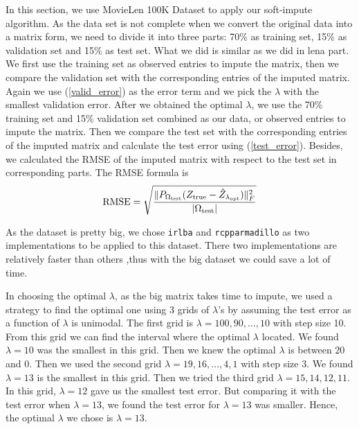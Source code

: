 \documentclass{article}
\begin{document}
	In this section, we use MovieLen 100K Dataset to apply our soft-impute algorithm. As the data set is not complete when we convert the original data into a matrix form, we need to divide it into three parts: 70\% as training set, 15\% as validation set and 15\% as test set. What we did is similar as we did in lena part. We first use the training set as observed entries to impute the matrix, then we compare the validation set with the corresponding entries of the imputed matrix. Again we use (\ref{valid_error}) as the error term and we pick the $\lambda$ with the smallest validation error. After we obtained the optimal $\lambda$, we use the 70\% training set and 15\% validation set combined as our data, or observed entries to impute the matrix. Then we compare the test set with the corresponding entries of the imputed matrix and calculate the test error using (\ref{test_error}). Besides, we calculated the RMSE of the imputed matrix with respect to the test set in corresponding parts. The RMSE formula is
	\begin{equation}
	\textrm{RMSE} = \sqrt{\frac{\|P_{\Omega_{\rm test}}(Z_{\rm true} - \hat{Z}_{\lambda_{\rm opt}})\|_{F}^2}{|\Omega_{\rm test}|}}
	\end{equation}

	As the dataset is pretty big, we chose \verb|irlba| and \verb|rcpparmadillo| as two implementations to be applied to this dataset. There two implementations are relatively faster than others ,thus with the big dataset we could save a lot of time. 

	In choosing the optimal $\lambda$, as the big matrix takes time to impute, we used a strategy to find the optimal one using 3 grids of $\lambda$'s by assuming the test error as a function of $\lambda$ is unimodal. The first grid is $\lambda = 100, 90, \ldots, 10$ with step size 10. From this grid we can find the interval where the optimal $\lambda$ located. We found $\lambda  = 10$ was the smallest in this grid. Then we knew the optimal $\lambda$ is between $20$ and $0$. Then we used the second grid $\lambda = 19, 16, \ldots, 4, 1$ with step size 3. We found $\lambda = 13$ is the smallest in this grid. Then we tried the third grid $\lambda = 15, 14, 12, 11$. In this grid, $\lambda = 12$ gave us the smallest test error. But comparing it with the test error when $\lambda = 13$, we found the test error for $\lambda =13$ was smaller. Hence, the optimal $\lambda$ we chose is $\lambda = 13$. 





	

	\newpage

	
	

	
	
\end{document}
